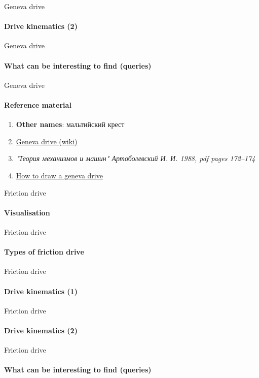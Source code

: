 \documentclass[aspectratio=169]{beamer}
\begin{document}
\begin{frame}[t]{Geneva drive}
    \framesubtitle{Drive kinematics (2)}

\end{frame}

\begin{frame}[t]{Geneva drive}
    \framesubtitle{What can be interesting to find (queries)}

\end{frame}

\begin{frame}[t]{Geneva drive}
    \framesubtitle{Reference material}
    \begin{enumerate}
        \item \textbf{Other names}: мальтийский крест
        \item \href{https://en.wikipedia.org/wiki/Geneva_drive}{Geneva drive (wiki)}
        \item \textit{"Теория механизмов и машин" Артоболевский И. И. 1988, pdf pages 172--174 }
        \item \href{https://www.youtube.com/watch?v=1lyWywC_z4o}{How to draw a geneva drive}
    \end{enumerate}
\end{frame}

\begin{frame}[t]{Friction drive}
    \framesubtitle{Visualisation}

\end{frame}

\begin{frame}[t]{Friction drive}
    \framesubtitle{Types of friction drive}

\end{frame}

\begin{frame}[t]{Friction drive}
    \framesubtitle{Drive kinematics (1)}

\end{frame}

\begin{frame}[t]{Friction drive}
    \framesubtitle{Drive kinematics (2)}

\end{frame}

\begin{frame}[t]{Friction drive}
    \framesubtitle{What can be interesting to find (queries)}

\end{frame}
\end{document}
